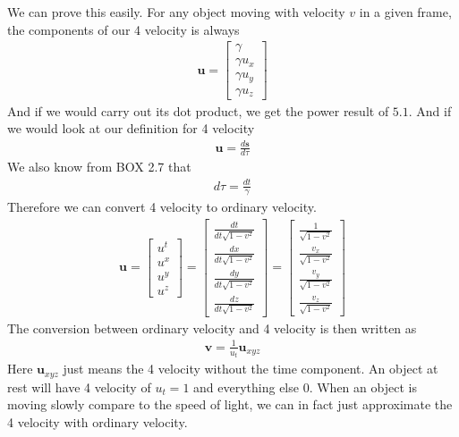 \documentclass[12pt]{book}
\newcommand{\dydx}[2]{\frac{d #1}{d #2}}
\begin{document}
We can prove this easily. For any object moving with velocity $v$ in a given frame, the components of our 4 velocity is always
\begin{align}
\mathbf{u}=\begin{bmatrix}
    \gamma\\ \gamma u_x \\ \gamma u_y \\\gamma u_z 
\end{bmatrix}
\end{align}
And if we would carry out its dot product, we get the power result of $5.1$. And if we would look at our definition for 4 velocity
\begin{align}
\mathbf{u} = \dydx{\mathbf{s}}{\tau}
\end{align}
We also know from BOX 2.7 that
\begin{align}
d\tau = \frac{dt}{\gamma}
\end{align}
Therefore we can convert 4 velocity to ordinary velocity.
\begin{align}
\mathbf{u}= 
\begin{bmatrix}
u^t \\
u^x \\
u^y \\
u^z
\end{bmatrix}
=
\begin{bmatrix}
\frac{dt}{dt\sqrt{1 - v^2}} \\
\frac{dx}{dt\sqrt{1 - v^2}} \\
\frac{dy}{dt\sqrt{1 - v^2}} \\
\frac{dz}{dt\sqrt{1 - v^2}}
\end{bmatrix}
=
\begin{bmatrix}
\frac{1}{\sqrt{1 - v^2}} \\
\frac{v_x}{\sqrt{1 - v^2}} \\
\frac{v_y}{\sqrt{1 - v^2}} \\
\frac{v_z}{\sqrt{1 - v^2}}
\end{bmatrix}
\end{align}
The conversion between ordinary velocity and 4 velocity is then written as
\begin{align}
\mathbf{v} = \frac{1}{u_t}\mathbf{u}_{xyz}
\end{align}
Here $\mathbf{u}_{xyz}$ just means the 4 velocity without the time component. An object at rest will have 4 velocity of $u_t = 1$ and everything else $0$. When an object is moving slowly compare to the speed of light, we can in fact just approximate the 4 velocity with ordinary velocity.
\end{document}
